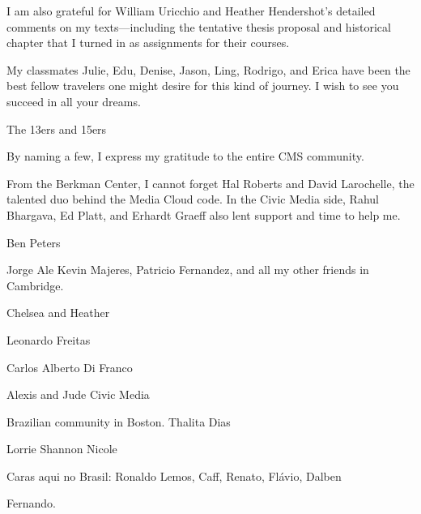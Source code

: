 I am also grateful for William Uricchio and Heather Hendershot's detailed comments on my texts---including the tentative thesis proposal and historical chapter that I turned in as assignments for their courses.

My classmates Julie, Edu, Denise, Jason, Ling, Rodrigo, and Erica have been the best fellow travelers one might desire for this kind of journey. I wish to see you succeed in all your dreams.

The 13ers and 15ers 

By naming a few, I express my gratitude to the entire CMS community.

From the Berkman Center, I cannot forget Hal Roberts and David Larochelle, the talented duo behind the Media Cloud code. In the Civic Media side, Rahul Bhargava, Ed Platt, and Erhardt Graeff also lent support and time to help me.

Ben Peters

Jorge Ale
Kevin Majeres, Patricio Fernandez, and all my other friends in Cambridge.

Chelsea and Heather

Leonardo Freitas

Carlos Alberto Di Franco

Alexis and Jude
Civic Media

Brazilian community in Boston.
Thalita Dias

Lorrie
Shannon
Nicole

Caras aqui no Brasil: Ronaldo Lemos, Caff, Renato, Flávio, Dalben

Fernando.
